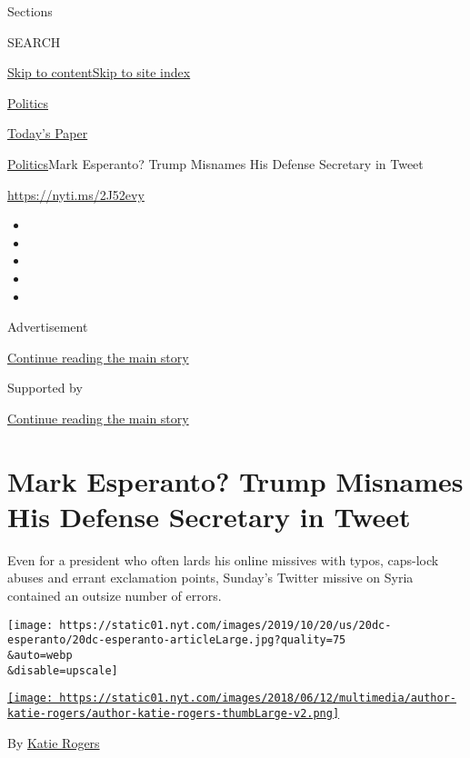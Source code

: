 Sections

SEARCH

\protect\hyperlink{site-content}{Skip to
content}\protect\hyperlink{site-index}{Skip to site index}

\href{https://www.nytimes.com/section/politics}{Politics}

\href{https://myaccount.nytimes.com/auth/login?response_type=cookie\&client_id=vi}{}

\href{https://www.nytimes.com/section/todayspaper}{Today's Paper}

\href{/section/politics}{Politics}\textbar{}Mark Esperanto? Trump
Misnames His Defense Secretary in Tweet

\url{https://nyti.ms/2J52evy}

\begin{itemize}
\item
\item
\item
\item
\item
\end{itemize}

Advertisement

\protect\hyperlink{after-top}{Continue reading the main story}

Supported by

\protect\hyperlink{after-sponsor}{Continue reading the main story}

\hypertarget{mark-esperanto-trump-misnames-his-defense-secretary-in-tweet}{%
\section{Mark Esperanto? Trump Misnames His Defense Secretary in
Tweet}\label{mark-esperanto-trump-misnames-his-defense-secretary-in-tweet}}

Even for a president who often lards his online missives with typos,
caps-lock abuses and errant exclamation points, Sunday's Twitter missive
on Syria contained an outsize number of errors.

\texttt{[image: https://static01.nyt.com/images/2019/10/20/us/20dc-esperanto/20dc-esperanto-articleLarge.jpg?quality=75\\\&auto=webp\\\&disable=upscale]}

\href{https://www.nytimes.com/by/katie-rogers}{\texttt{[image: https://static01.nyt.com/images/2018/06/12/multimedia/author-katie-rogers/author-katie-rogers-thumbLarge-v2.png]}}

By \href{https://www.nytimes.com/by/katie-rogers}{Katie Rogers}

